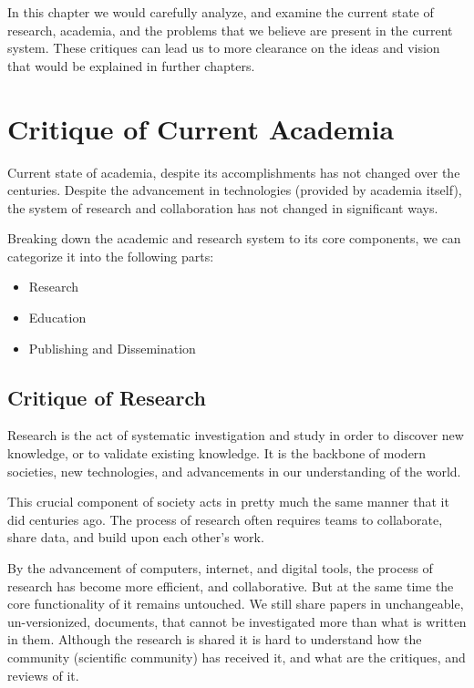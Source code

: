 In this chapter we would carefully analyze, and examine the current state of research, academia, and the problems that we believe are present in the current system.
These critiques can lead us to more clearance on the ideas and vision that would be explained in further chapters.


\section{Critique of Current Academia}\label{sec:critique-of-current-academia}

Current state of academia, despite its accomplishments has not changed over the centuries.
Despite the advancement in technologies (provided by academia itself), the system of research and collaboration has not changed in significant ways.

Breaking down the academic and research system to its core components, we can categorize it into the following parts:
\begin{itemize}
    \item Research
    \item Education
    \item Publishing and Dissemination
\end{itemize}

\subsection{Critique of Research}\label{subsec:critique-of-research}

Research is the act of systematic investigation and study in order to discover new knowledge, or to validate existing knowledge.
It is the backbone of modern societies, new technologies, and advancements in our understanding of the world.

This crucial component of society acts in pretty much the same manner that it did centuries ago.
The process of research often requires teams to collaborate, share data, and build upon each other's work.

By the advancement of computers, internet, and digital tools, the process of research has become more efficient, and collaborative.
But at the same time the core functionality of it remains untouched.
We still share papers in unchangeable, un-versionized, documents, that cannot be investigated more than what is written in them.
Although the research is shared it is hard to understand how the community (scientific community) has received it, and what are the critiques, and reviews of it.


